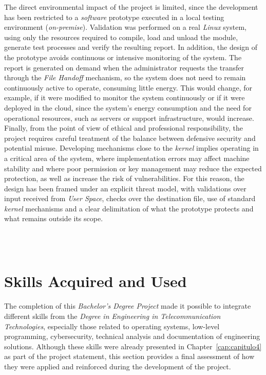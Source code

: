 The direct environmental impact of the project is limited, since the development has been restricted to a \textit{software} prototype executed in a local testing environment (\textit{on-premise}).
Validation was performed on a real \textit{Linux} system, using only the resources required to compile, load and unload the module, generate test processes and verify the resulting report.
In addition, the design of the prototype avoids continuous or intensive monitoring of the system.
The report is generated on demand when the administrator requests the transfer through the \textit{File Handoff} mechanism, so the system does not need to remain continuously active to operate, consuming little energy.
This would change, for example, if it were modified to monitor the system continuously or if it were deployed in the cloud, since the system's energy consumption and the need for operational resources, such as servers or support infrastructure, would increase.\\

Finally, from the point of view of ethical and professional responsibility, the project requires careful treatment of the balance between defensive security and potential misuse.
Developing mechanisms close to the \textit{kernel} implies operating in a critical area of the system, where implementation errors may affect machine stability and where poor permission or key management may reduce the expected protection, as well as increase the risk of vulnerabilities.
For this reason, the design has been framed under an explicit threat model, with validations over input received from \textit{User Space}, checks over the destination file, use of standard \textit{kernel} mechanisms and a clear delimitation of what the prototype protects and what remains outside its scope.\\

\

\

\section{Skills Acquired and Used}

The completion of this \textit{Bachelor's Degree Project} made it possible to integrate different skills from the \textit{Degree in Engineering in Telecommunication Technologies}, especially those related to operating systems, low-level programming, cybersecurity, technical analysis and documentation of engineering solutions.
Although these skills were already presented in Chapter~\ref{cap:capitulo4} as part of the project statement, this section provides a final assessment of how they were applied and reinforced during the development of the project.\\

